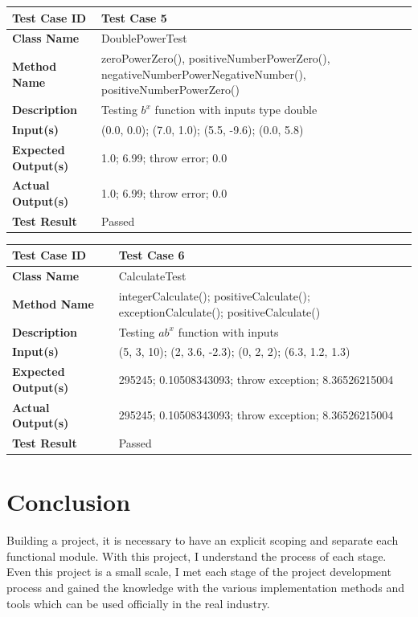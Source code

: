 \documentclass[11pt]{article}
\begin{document}
\begin{center}
    \begin{tabular}{|p{4cm}|p{11cm}| }
    \hline
    \textbf{Test Case ID} & Test Case 5\\ \hline 
    \textbf{Class Name} & DoublePowerTest\\ \hline 
    \textbf{Method Name} & zeroPowerZero(),  positiveNumberPowerZero(), negativeNumberPowerNegativeNumber(), positiveNumberPowerZero()  \\ \hline 
    \textbf{Description} & Testing $b^x$ function with inputs type double \\ \hline
    \textbf{Input(s)} & (0.0, 0.0); (7.0, 1.0); (5.5, -9.6); (0.0, 5.8)\\  \hline
    \textbf{Expected Output(s)} & 1.0; 6.99; throw error; 0.0 \\ \hline
    \textbf{Actual Output(s)} & 1.0; 6.99; throw error; 0.0 \\ \hline
    \textbf{Test Result} & Passed\\ \hline
\end{tabular}
\end{center}

\begin{center}
    \begin{tabular}{|p{4cm}|p{11cm}| }
    \hline
    \textbf{Test Case ID} & Test Case 6\\ \hline 
    \textbf{Class Name} & CalculateTest\\ \hline 
    \textbf{Method Name} & integerCalculate(); positiveCalculate(); exceptionCalculate(); positiveCalculate()\\ \hline 
    \textbf{Description} & Testing $ab^x$ function with inputs\\ \hline
    \textbf{Input(s)} & (5, 3, 10); (2, 3.6, -2.3); (0, 2, 2); (6.3, 1.2, 1.3)\\  \hline
    \textbf{Expected Output(s)} & 295245; 0.10508343093; throw exception; 8.36526215004 \\ \hline
    \textbf{Actual Output(s)} & 295245; 0.10508343093; throw exception; 8.36526215004 \\ \hline
    \textbf{Test Result} & Passed\\ \hline
\end{tabular}
\end{center}

\section{Conclusion}
Building a project, it is necessary to have an explicit scoping and separate each functional module. With this project, I understand the process of each stage. Even this project is a small scale, I met each stage of the project development process and gained the knowledge with the various implementation methods and tools which can be used officially in the real industry.

\newpage


\end{document}
